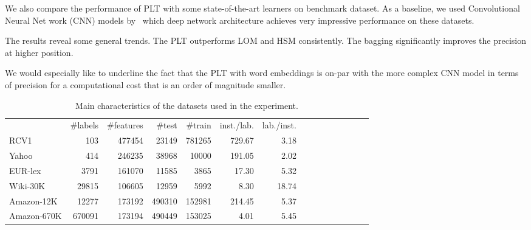 \documentclass{article}
\newcommand{\Algo}[1]{\textsc{#1}}
\begin{document}
{We also compare the performance of \Algo{PLT} with some state-of-the-art learners on benchmark dataset. As a baseline, we used Convolutional Neural Net work (CNN) models by~\citep{Liu_et_al_2017} which deep network architecture achieves very impressive  performance on these datasets.

The results reveal some general trends. The PLT outperforms LOM and HSM consistently. The bagging significantly improves the precision at higher position. 

We would especially like to underline the fact that the PLT with word embeddings is on-par with the more complex CNN model in terms of precision for a computational cost that is an order of magnitude smaller.




\begin{table*}[t!]
\vspace{-.2cm}
        \caption{Main characteristics of the datasets used in the experiment.}
        \label{tab:datasets-differences-table}
        \begin{center}
                \begin{small}
                        \begin{tabular}{l@{\hskip 4pt} | r@{\hskip 4pt} r@{\hskip 4pt} r@{\hskip 4pt} r@{\hskip 4pt} r@{\hskip 4pt} r@{\hskip 4pt} | r@{\hskip 4pt} r@{\hskip 4pt} r@{\hskip 4pt} | r@{\hskip 4pt} | r@{\hskip 4pt} r@{\hskip 4pt} r@{\hskip 4pt} | r@{\hskip 4pt} }
                                \toprule
& \#labels &\#features &\#test &\#train & inst./lab. & lab./inst.  \\
RCV1 & 103 & 477454 & 23149 & 781265 & 729.67 & 3.18 \\ 
Yahoo & 414 & 246235 & 38968 & 10000 & 191.05 & 2.02 \\ 
EUR-lex & 3791 & 161070 & 11585 & 3865 & 17.30 & 5.32 \\ 
Wiki-30K & 29815 & 106605 & 12959 & 5992 & 8.30 & 18.74 \\ 
Amazon-12K & 12277 & 173192 & 490310 & 152981 & 214.45 & 5.37 \\ 
Amazon-670K & 670091 & 173194 & 490449 & 153025 & 4.01 & 5.45 \\ 
                                \midrule
                                \bottomrule
                        \end{tabular}
                \end{small}
        \end{center}
                        \vspace{-0.4cm}
\end{table*}


}
\end{document}

